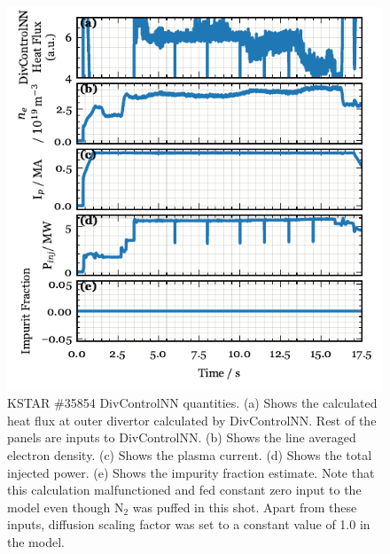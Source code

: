 \begin{figure}[!ht]
 \centering
 \includegraphics[width=\linewidth]{figures/SM_inputs_35854.pdf}
 \caption{
KSTAR \#35854 DivControlNN quantities.
(a) Shows the calculated heat flux at outer divertor calculated by DivControlNN.
Rest of the panels are inputs to DivControlNN.
(b) Shows the line averaged electron density.
(c) Shows the plasma current.
(d) Shows the total injected power.
(e) Shows the impurity fraction estimate.
Note that this calculation malfunctioned and fed constant zero input to the model even though N$_2$ was puffed in this shot.
Apart from these inputs, diffusion scaling factor was set to a constant value of 1.0 in the model.
}
 \label{fig:SM_inputs_35853}
\end{figure}